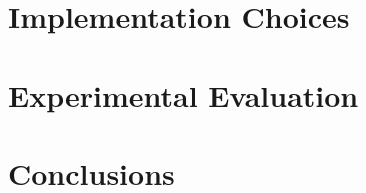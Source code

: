 \documentclass[times,9pt,article]{llncs}
\begin{document}
\section{Implementation Choices}




\section{Experimental Evaluation}


\section{Conclusions}
\end{document}
